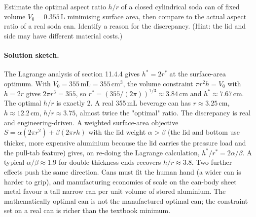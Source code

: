\begin{exercise}
Estimate the optimal aspect ratio $h/r$ of a closed cylindrical
soda can of fixed volume $V_{0} = 0.355\,\si{\liter}$ minimising
surface area, then compare to the actual aspect ratio of a real
soda can. Identify a reason for the discrepancy. (Hint: the lid and
side may have different material costs.)

\paragraph{Solution sketch.} The Lagrange analysis of section
11.4.4 gives $h^{*} = 2 r^{*}$ at the surface-area optimum. With
$V_{0} = 355\,\si{\milli\liter} = 355\,\si{\centi\meter\cubed}$,
the volume constraint $\pi r^{2} h = V_{0}$ with $h = 2 r$ gives
$2\pi r^{3} = 355$, so $r^{*} = (355 / (2\pi))^{1/3} \approx
3.84\,\si{\centi\meter}$ and $h^{*} \approx 7.67\,\si{\centi\meter}$.
The optimal $h/r$ is exactly $2$. A real 355\,mL beverage can has
$r \approx 3.25\,\si{\centi\meter}$, $h \approx
12.2\,\si{\centi\meter}$, $h/r \approx 3.75$, almost twice the
"optimal" ratio. The discrepancy is real and engineering-driven.
A weighted surface-area objective $S = \alpha (2\pi r^{2}) + \beta
(2\pi r h)$ with the lid weight $\alpha > \beta$ (the lid and bottom
use thicker, more expensive aluminium because the lid carries the
pressure load and the pull-tab feature) gives, on re-doing the
Lagrange calculation, $h^{*}/r^{*} = 2\alpha/\beta$. A typical
$\alpha/\beta \approx 1.9$ for double-thickness ends recovers
$h/r \approx 3.8$. Two further effects push the same direction.
Cans must fit the human hand (a wider can is harder to grip), and
manufacturing economies of scale on the can-body sheet metal favour
a tall narrow can per unit volume of stored aluminium. The
mathematically optimal can is not the manufactured optimal can; the
constraint set on a real can is richer than the textbook minimum.
\end{exercise}


